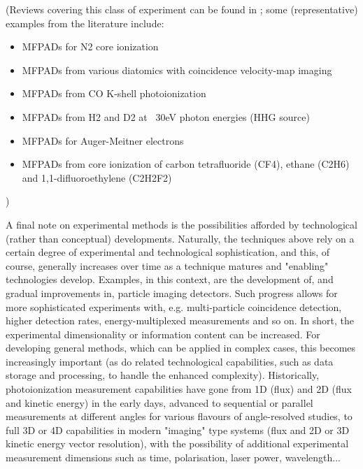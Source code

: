 (Reviews covering this class of experiment can be found in  \cite{Yagishita2005,Reid2012,Yagishita2015}; some (representative) examples from the literature include:
\begin{itemize}
\item MFPADs for N2 core ionization \cite{Shigemasa1995}
\item MFPADs from various diatomics with coincidence velocity-map imaging \cite{Eland2000}
\item MFPADs from CO K-shell photoionization \cite{motoki2000KshellPhotoionizationCO}
\item MFPADs from H2 and D2 at ~30eV photon energies (HHG source) \cite{Billaud2012a}
\item MFPADs for Auger-Meitner electrons \cite{Cryan2012a}
%
\item MFPADs from core ionization of carbon tetrafluoride (CF4), ethane (C2H6) and 1,1-difluoroethylene (C2H2F2)\cite{Menssen2016}
\end{itemize}

)

A final note on experimental methods is the possibilities afforded by technological (rather than conceptual) developments. Naturally, the techniques above rely on a certain degree of experimental and technological sophistication, and this, of course, generally increases over time as a technique matures and "enabling" technologies develop. Examples, in this context, are the development of, and gradual improvements in, particle imaging detectors. Such progress allows for more sophisticated experiments with, e.g. multi-particle coincidence detection, higher detection rates, energy-multiplexed measurements and so on. In short, the experimental dimensionality or information content can be increased. For developing general methods, which can be applied in complex cases, this becomes increasingly important (as do related technological capabilities, such as data storage and processing, to handle the enhanced complexity). Historically, photoionization measurement capabilities have gone from 1D (flux) and 2D (flux and kinetic energy) in the early days, advanced to sequential or parallel measurements at different angles for various flavours of angle-resolved studies, to full 3D or 4D capabilities in modern "imaging" type systems (flux and 2D or 3D kinetic energy vector resolution), with the possibility of additional experimental measurement dimensions such as time, polarisation, laser power, wavelength...